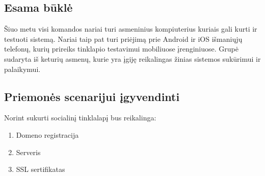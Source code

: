 \documentclass{VUMIFPSkursinis}
\begin{document}
\subsection{Esama būklė}
Šiuo metu visi komandos nariai turi asmeninius kompiuterius kuriais gali kurti ir testuoti sistemą. Nariai taip pat turi priėjimą prie Android ir iOS išmaniųjų telefonų, kurių prireiks tinklapio testavimui mobiliuose įrenginiuose. Grupė sudaryta iš keturių asmenų, kurie yra įgiję reikalingas žinias sistemos sukūrimui ir palaikymui.
\subsection{Priemonės scenarijui įgyvendinti}
Norint sukurti socialinį tinklalapį bus reikalinga:
\begin{enumerate}
	\item Domeno registracija
	\item Serveris
	\item SSL sertifikatas
\end{enumerate}
\end{document}
